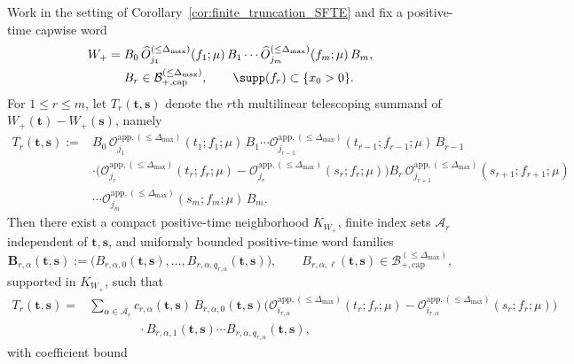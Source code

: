 \begin{lemFspecial}\label{lem:finite_cap_mixed_channel_reduction}
Work in the setting of Corollary~\ref{cor:finite_truncation_SFTE} and fix a positive-time capwise word
\[
\begin{aligned}
W_+
={}&
B_0\,\widehat O_{j_1}^{(\le \Delta_{\max})}(f_1;\mu)\,B_1\cdots
\widehat O_{j_m}^{(\le \Delta_{\max})}(f_m;\mu)\,B_m,\\
& B_r\in\mathcal B^{(\le \Delta_{\max})}_{+,\mathrm{cap}},
\qquad
\supp(f_r)\subset\{x_0>0\}.
\end{aligned}
\]
For $1\le r\le m$, let $T_r(\mathbf t,\mathbf s)$ denote the $r$th multilinear telescoping summand of $W_+(\mathbf t)-W_+(\mathbf s)$, namely
\[
\begin{aligned}
T_r(\mathbf t,\mathbf s)
:={}&
B_0\,\mathcal O_{j_1}^{\mathrm{app},(\le \Delta_{\max})}(t_1;f_1;\mu)\,B_1\cdots
\mathcal O_{j_{r-1}}^{\mathrm{app},(\le \Delta_{\max})}(t_{r-1};f_{r-1};\mu)\,B_{r-1}\\
&\cdot
\bigl(
\mathcal O_{j_r}^{\mathrm{app},(\le \Delta_{\max})}(t_r;f_r;\mu)
-
\mathcal O_{j_r}^{\mathrm{app},(\le \Delta_{\max})}(s_r;f_r;\mu)
\bigr)
B_r\,\mathcal O_{j_{r+1}}^{\mathrm{app},(\le \Delta_{\max})}(s_{r+1};f_{r+1};\mu)\\
&\cdots
\mathcal O_{j_m}^{\mathrm{app},(\le \Delta_{\max})}(s_m;f_m;\mu)\,B_m.
\end{aligned}
\]
Then there exist a compact positive-time neighborhood $K_{W_+}$, finite index sets $\mathcal A_r$ independent of $\mathbf t,\mathbf s$, and uniformly bounded positive-time word families
\[
\mathbf B_{r,\alpha}(\mathbf t,\mathbf s)
:=
\bigl(B_{r,\alpha,0}(\mathbf t,\mathbf s),\dots,B_{r,\alpha,q_{r,\alpha}}(\mathbf t,\mathbf s)\bigr),
\qquad
B_{r,\alpha,\ell}(\mathbf t,\mathbf s)\in\mathcal B^{(\le \Delta_{\max})}_{+,\mathrm{cap}},
\]
supported in $K_{W_+}$, such that
\[
\begin{aligned}
T_r(\mathbf t,\mathbf s)
={}&
\sum_{\alpha\in\mathcal A_r}
 c_{r,\alpha}(\mathbf t,\mathbf s)\,
B_{r,\alpha,0}(\mathbf t,\mathbf s)
\bigl(
\mathcal O_{i_{r,\alpha}}^{\mathrm{app},(\le \Delta_{\max})}(t_r;f_r;\mu)
-
\mathcal O_{i_{r,\alpha}}^{\mathrm{app},(\le \Delta_{\max})}(s_r;f_r;\mu)
\bigr)\\
&\qquad\qquad\cdot
B_{r,\alpha,1}(\mathbf t,\mathbf s)\cdots B_{r,\alpha,q_{r,\alpha}}(\mathbf t,\mathbf s),
\end{aligned}
\]
with coefficient bound
\[
\begin{aligned}

\end{aligned}\]
\end{lemFspecial}
